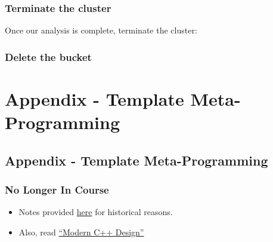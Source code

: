 \subsubsection{Terminate the cluster}\label{terminate-the-cluster}

Once our analysis is complete, terminate the cluster:

\begin{Shaded}
\begin{Highlighting}[]
\NormalTok{$ } \KeywordTok{<}\KeywordTok{>}
\end{Highlighting}
\end{Shaded}

\subsubsection{Delete the bucket}\label{delete-the-bucket}

\begin{Shaded}
\begin{Highlighting}[]
\NormalTok{$ } 
\end{Highlighting}
\end{Shaded}

\section{Appendix - Template
Meta-Programming}\label{appendix---template-meta-programming}

\subsection{Appendix - Template
Meta-Programming}\label{appendix---template-meta-programming-1}

\subsubsection{No Longer In Course}\label{no-longer-in-course}

\begin{itemize}
\itemsep1pt\parskip0pt
\item
  Notes provided \href{sec01TemplateMeta}{here} for historical reasons.
\item
  Also, read
  \href{http://erdani.com/index.php/books/modern-c-design/}{``Modern C++
  Design''}
\end{itemize}

